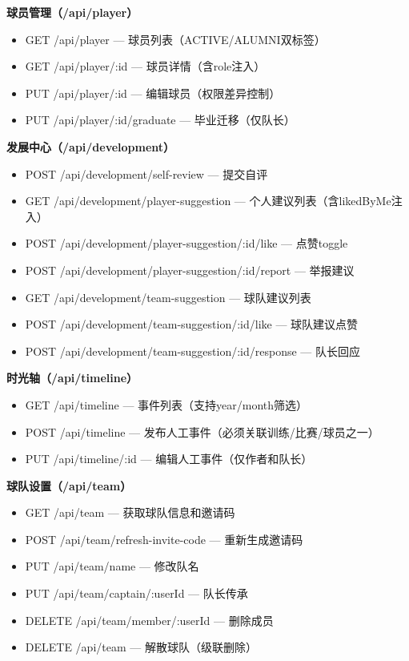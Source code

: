 \documentclass[12pt,a4paper]{ctexart}
\begin{document}
\textbf{球员管理（/api/player）}
\begin{itemize}[leftmargin=2em]
\item GET /api/player — 球员列表（ACTIVE/ALUMNI双标签）
\item GET /api/player/:id — 球员详情（含role注入）
\item PUT /api/player/:id — 编辑球员（权限差异控制）
\item PUT /api/player/:id/graduate — 毕业迁移（仅队长）
\end{itemize}

\textbf{发展中心（/api/development）}
\begin{itemize}[leftmargin=2em]
\item POST /api/development/self-review — 提交自评
\item GET /api/development/player-suggestion — 个人建议列表（含likedByMe注入）
\item POST /api/development/player-suggestion/:id/like — 点赞toggle
\item POST /api/development/player-suggestion/:id/report — 举报建议
\item GET /api/development/team-suggestion — 球队建议列表
\item POST /api/development/team-suggestion/:id/like — 球队建议点赞
\item POST /api/development/team-suggestion/:id/response — 队长回应
\end{itemize}

\textbf{时光轴（/api/timeline）}
\begin{itemize}[leftmargin=2em]
\item GET /api/timeline — 事件列表（支持year/month筛选）
\item POST /api/timeline — 发布人工事件（必须关联训练/比赛/球员之一）
\item PUT /api/timeline/:id — 编辑人工事件（仅作者和队长）
\end{itemize}

\textbf{球队设置（/api/team）}
\begin{itemize}[leftmargin=2em]
\item GET /api/team — 获取球队信息和邀请码
\item POST /api/team/refresh-invite-code — 重新生成邀请码
\item PUT /api/team/name — 修改队名
\item PUT /api/team/captain/:userId — 队长传承
\item DELETE /api/team/member/:userId — 删除成员
\item DELETE /api/team — 解散球队（级联删除）
\end{itemize}
\end{document}
